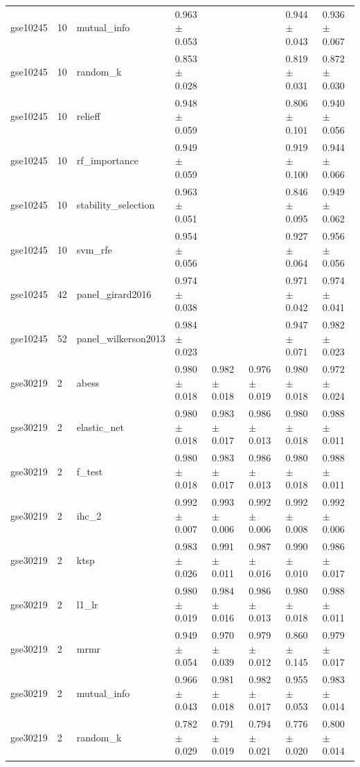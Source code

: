 \begin{table}[t]
\begin{tabular}{llllllll}
    gse10245 & 10 & mutual\_info & 0.963 $\pm$ 0.053 &  &  & 0.944 $\pm$ 0.043 & 0.936 $\pm$ 0.067 \\
    gse10245 & 10 & random\_k & 0.853 $\pm$ 0.028 &  &  & 0.819 $\pm$ 0.031 & 0.872 $\pm$ 0.030 \\
    gse10245 & 10 & relieff & 0.948 $\pm$ 0.059 &  &  & 0.806 $\pm$ 0.101 & 0.940 $\pm$ 0.056 \\
    gse10245 & 10 & rf\_importance & 0.949 $\pm$ 0.059 &  &  & 0.919 $\pm$ 0.100 & 0.944 $\pm$ 0.066 \\
    gse10245 & 10 & stability\_selection & 0.963 $\pm$ 0.051 &  &  & 0.846 $\pm$ 0.095 & 0.949 $\pm$ 0.062 \\
    gse10245 & 10 & svm\_rfe & 0.954 $\pm$ 0.056 &  &  & 0.927 $\pm$ 0.064 & 0.956 $\pm$ 0.056 \\
    gse10245 & 42 & panel\_girard2016 & 0.974 $\pm$ 0.038 &  &  & 0.971 $\pm$ 0.042 & 0.974 $\pm$ 0.041 \\
    gse10245 & 52 & panel\_wilkerson2013 & 0.984 $\pm$ 0.023 &  &  & 0.947 $\pm$ 0.071 & 0.982 $\pm$ 0.023 \\
    gse30219 & 2 & abess & 0.980 $\pm$ 0.018 & 0.982 $\pm$ 0.018 & 0.976 $\pm$ 0.019 & 0.980 $\pm$ 0.018 & 0.972 $\pm$ 0.024 \\
    gse30219 & 2 & elastic\_net & 0.980 $\pm$ 0.018 & 0.983 $\pm$ 0.017 & 0.986 $\pm$ 0.013 & 0.980 $\pm$ 0.018 & 0.988 $\pm$ 0.011 \\
    gse30219 & 2 & f\_test & 0.980 $\pm$ 0.018 & 0.983 $\pm$ 0.017 & 0.986 $\pm$ 0.013 & 0.980 $\pm$ 0.018 & 0.988 $\pm$ 0.011 \\
    gse30219 & 2 & ihc\_2 & 0.992 $\pm$ 0.007 & 0.993 $\pm$ 0.006 & 0.992 $\pm$ 0.006 & 0.992 $\pm$ 0.008 & 0.992 $\pm$ 0.006 \\
    gse30219 & 2 & ktsp & 0.983 $\pm$ 0.026 & 0.991 $\pm$ 0.011 & 0.987 $\pm$ 0.016 & 0.990 $\pm$ 0.010 & 0.986 $\pm$ 0.017 \\
    gse30219 & 2 & l1\_lr & 0.980 $\pm$ 0.019 & 0.984 $\pm$ 0.016 & 0.986 $\pm$ 0.013 & 0.980 $\pm$ 0.018 & 0.988 $\pm$ 0.011 \\
    gse30219 & 2 & mrmr & 0.949 $\pm$ 0.054 & 0.970 $\pm$ 0.039 & 0.979 $\pm$ 0.012 & 0.860 $\pm$ 0.145 & 0.979 $\pm$ 0.017 \\
    gse30219 & 2 & mutual\_info & 0.966 $\pm$ 0.043 & 0.981 $\pm$ 0.018 & 0.982 $\pm$ 0.017 & 0.955 $\pm$ 0.053 & 0.983 $\pm$ 0.014 \\
    gse30219 & 2 & random\_k & 0.782 $\pm$ 0.029 & 0.791 $\pm$ 0.019 & 0.794 $\pm$ 0.021 & 0.776 $\pm$ 0.020 & 0.800 $\pm$ 0.014 \\

\end{tabular}
\end{table}
